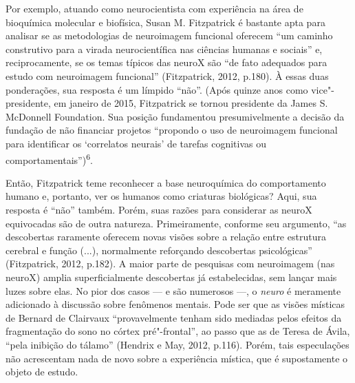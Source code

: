 Por exemplo, atuando como neurocientista com experiência na área de
bioquímica molecular e biofísica, Susan M. Fitzpatrick é bastante apta
para analisar se as metodologias de neuroimagem funcional oferecem ``um
caminho construtivo para a virada neurocientífica nas ciências humanas e
sociais'' e, reciprocamente, se os temas típicos das neuroX são ``de
fato adequados para estudo com neuroimagem funcional'' (Fitzpatrick,
2012, p.180). À essas duas ponderações, sua resposta é um límpido
``não''. (Após quinze anos como vice"-presidente, em janeiro de 2015,
Fitzpatrick se tornou presidente da James S. McDonnell Foundation. Sua
posição fundamentou presumivelmente a decisão da fundação de não
financiar projetos ``propondo o uso de neuroimagem funcional para
identificar os `correlatos neurais' de tarefas cognitivas ou
comportamentais'')\textsuperscript{6}.

Então, Fitzpatrick teme reconhecer a base neuroquímica do comportamento
humano e, portanto, ver os humanos como criaturas biológicas? Aqui, sua
resposta é ``não'' também. Porém, suas razões para considerar as neuroX
equivocadas são de outra natureza. Primeiramente, conforme seu
argumento, ``as descobertas raramente oferecem novas visões sobre a
relação entre estrutura cerebral e função (...), normalmente reforçando
descobertas psicológicas'' (Fitzpatrick, 2012, p.182). A maior parte de
pesquisas com neuroimagem (nas neuroX) amplia superficialmente
descobertas já estabelecidas, sem lançar mais luzes sobre elas. No pior
dos casos --- e são numerosos ---, o \emph{neuro} é meramente adicionado
à discussão sobre fenômenos mentais. Pode ser que as visões místicas de
Bernard de Clairvaux ``provavelmente tenham sido mediadas pelos efeitos
da fragmentação do sono no córtex pré"-frontal'', ao passo que as de
Teresa de Ávila, ``pela inibição do tálamo'' (Hendrix e May, 2012,
p.116). Porém, tais especulações não acrescentam nada de novo sobre a
experiência mística, que é supostamente o objeto de estudo.

